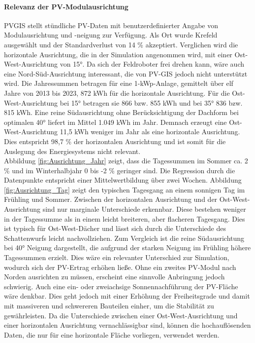 \paragraph{Relevanz der PV-Modulausrichtung} \label{ausrichtung}
PVGIS \cite{PVGIS} stellt stündliche PV-Daten mit benutzerdefinierter Angabe von Modulausrichtung und -neigung zur Verfügung. Als Ort wurde Krefeld ausgewählt und der Standardverlust von 14 \% akzeptiert. Verglichen wird die horizontale Ausrichtung, die in der Simulation angenommen wird, mit einer Ost-West-Ausrichtung von 15°. Da sich der Feldroboter frei drehen kann, wäre auch eine Nord-Süd-Ausrichtung interessant, die von PV-GIS jedoch nicht unterstützt wird. Die Jahressummen betragen für eine 1-kWp-Anlage, gemittelt über elf Jahre von 2013 bis 2023, 872 kWh für die horizontale Ausrichtung.  Für die Ost-West-Ausrichtung bei 15° betragen sie 866 bzw. 855 kWh und bei 35° 836 bzw. 815 kWh. Eine reine Südausrichtung ohne Berücksichtigung der Dachform bei optimalen 40° liefert im Mittel 1.049 kWh im Jahr. Demnach erzeugt eine Ost-West-Ausrichtung 11,5 kWh weniger im Jahr als eine horizontale Ausrichtung. Dies entspricht 98,7 \% der horizontalen Ausrichtung und ist somit für die Auslegung des Energiesystems nicht relevant.\\
Abbildung \ref{fig:Ausrichtung_Jahr} zeigt, dass die Tagessummen im Sommer ca. 2 \% und im Winterhalbjahr 0 bis -2 \% geringer sind. Die Regression durch die Datenpunkte entspricht einer Mittelwertbildung über zwei Wochen.
Abbildung \ref{fig:Ausrichtung_Tag} zeigt den typischen Tagesgang an einem sonnigen Tag im Frühling und Sommer. Zwischen der horizontalen Ausrichtung und der Ost-West-Ausrichtung sind nur marginale Unterschiede erkennbar. Diese bestehen weniger in der Tagessumme als in einem leicht breiteren, aber flacheren Tagesgang. Dies ist typisch für Ost-West-Dächer und lässt sich durch die Unterschiede des Schattenwurfs leicht nachvollziehen. Zum Vergleich ist die reine Südausrichtung bei 40° Neigung dargestellt, die aufgrund der starken Neigung im Frühling höhere Tagessummen erzielt. Dies wäre ein relevanter Unterschied zur Simulation, wodurch sich der PV-Ertrag erhöhen ließe. Ohne ein zweites PV-Modul nach Norden ausrichten zu müssen, erscheint eine sinnvolle Anbringung jedoch schwierig. Auch eine ein- oder zweiachsige Sonnennachführung der PV-Fläche wäre denkbar. Dies geht jedoch mit einer Erhöhung der Freiheitsgrade und damit mit massiveren und schwereren Bauteilen einher, um die Stabilität zu gewährleisten. Da die Unterschiede zwischen einer Ost-West-Ausrichtung und einer horizontalen Ausrichtung vernachlässigbar sind, können die hochauflösenden Daten, die nur für eine horizontale Fläche vorliegen, verwendet werden.

